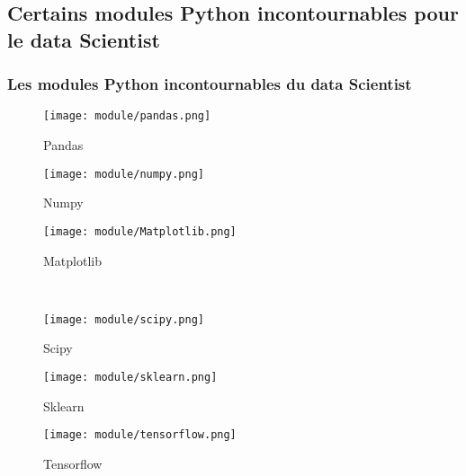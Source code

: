\documentclass{beamer}
\theoremstyle{definition}
\begin{document}
\subsection{Certains modules Python incontournables pour le data Scientist}
\begin{frame}
	\frametitle{Les modules Python incontournables du data Scientist}
	\begin{minipage}[t]{1\linewidth}
		\centering
		\begin{minipage}[t]{0.3\linewidth}		
			\begin{figure}
				\centering
				\texttt{[image: module/pandas.png]}
				\caption*{Pandas}	
			\end{figure}
		\end{minipage}\hfil
		\begin{minipage}[t]{0.3\linewidth}		
			\begin{figure}
				\centering
				\texttt{[image: module/numpy.png]}
				\caption*{Numpy}	
			\end{figure}
		\end{minipage}\hfil
		\begin{minipage}[t]{0.3\linewidth}		
			\begin{figure}
				\centering
				\texttt{[image: module/Matplotlib.png]}
				\caption*{Matplotlib}	
			\end{figure}
		\end{minipage}
	\end{minipage}\hfil\\[0.25cm]

	\begin{minipage}[c]{1\linewidth}\quad
		\begin{minipage}[c]{0.3\linewidth}		
			\begin{figure}
				\centering
				\texttt{[image: module/scipy.png]}
				\caption*{Scipy}	
			\end{figure}
		\end{minipage}\hfil 
		\begin{minipage}[c]{0.3\linewidth}		
			\begin{figure}
				\centering
				\texttt{[image: module/sklearn.png]}
				\caption*{Sklearn}	
			\end{figure}
		\end{minipage}\hfil
	\begin{minipage}[c]{0.3\linewidth}		
		\begin{figure}
			\centering
			\texttt{[image: module/tensorflow.png]}
			\caption*{Tensorflow}	
		\end{figure}
	\end{minipage}
	\end{minipage}
	
\end{frame}
\end{document}
